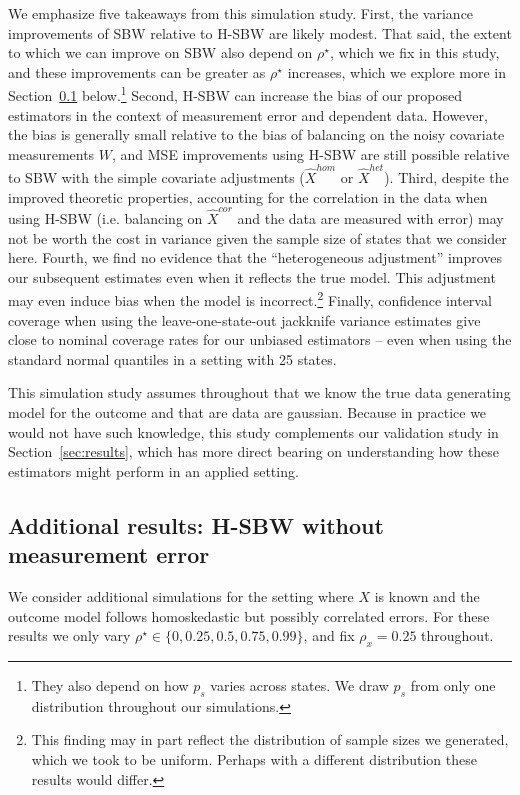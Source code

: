 We emphasize five takeaways from this simulation study. First, the variance improvements of SBW relative to H-SBW are likely modest. That said, the extent to which we can improve on SBW also depend on $\rho^\star$, which we fix in this study, and these improvements can be greater as $\rho^\star$ increases, which we explore more in Section~\ref{appssec:simstudyresults2} below.\footnote{They also depend on how $p_s$ varies across states. We draw $p_s$ from only one distribution throughout our simulations.} Second, H-SBW can increase the bias of our proposed estimators in the context of measurement error and dependent data. However, the bias is generally small relative to the bias of balancing on the noisy covariate measurements $W$, and MSE improvements using H-SBW are still possible relative to SBW with the simple covariate adjustments ($\hat{X}^{hom}$ or $\hat{X}^{het}$). Third, despite the improved theoretic properties, accounting for the correlation in the data when using H-SBW (i.e. balancing on $\hat{X}^{cor}$ and the data are measured with error) may not be worth the cost in variance given the sample size of states that we consider here. Fourth, we find no evidence that the ``heterogeneous adjustment'' improves our subsequent estimates even when it reflects the true model. This adjustment may even induce bias when the model is incorrect.\footnote{This finding may in part reflect the distribution of sample sizes we generated, which we took to be uniform. Perhaps with a different distribution these results would differ.} Finally, confidence interval coverage when using the leave-one-state-out jackknife variance estimates give close to nominal coverage rates for our unbiased estimators -- even when using the standard normal quantiles in a setting with 25 states. 

This simulation study assumes throughout that we know the true data generating model for the outcome and that are data are gaussian. Because in practice we would not have such knowledge, this study complements our validation study in Section~\ref{sec:results}, which has more direct bearing on understanding how these estimators might perform in an applied setting.

\subsection{Additional results: H-SBW without measurement error}\label{appssec:simstudyresults2}

We consider additional simulations for the setting where $X$ is known and the outcome model follows homoskedastic but possibly correlated errors. For these results we only vary $\rho^\star \in \{0, 0.25, 0.5, 0.75, 0.99\}$, and fix $\rho_x = 0.25$ throughout. 

